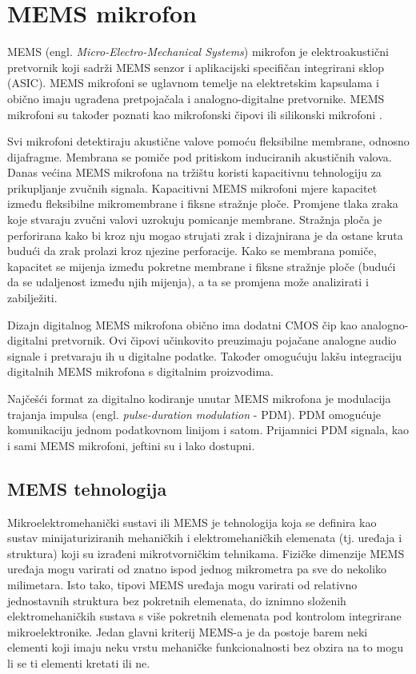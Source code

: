 \section{MEMS mikrofon}

MEMS (engl. \textit{Micro-Electro-Mechanical Systems}) mikrofon je elektroakustični pretvornik koji sadrži MEMS senzor i aplikacijski specifičan integrirani sklop (ASIC). MEMS mikrofoni se uglavnom temelje na elektretskim kapsulama i obično imaju ugrađena pretpojačala i analogno-digitalne pretvornike. MEMS mikrofoni su također poznati kao mikrofonski čipovi ili silikonski mikrofoni \cite{whatismems}. 

Svi mikrofoni detektiraju akustične valove pomoću fleksibilne membrane, odnosno dijafragme. Membrana se pomiče pod pritiskom induciranih akustičnih valova. Danas većina MEMS mikrofona na tržištu koristi kapacitivnu tehnologiju za prikupljanje zvučnih signala. Kapacitivni MEMS mikrofoni mjere kapacitet između fleksibilne mikromembrane i fiksne stražnje ploče. Promjene tlaka zraka koje stvaraju zvučni valovi uzrokuju pomicanje membrane. Stražnja ploča je perforirana kako bi kroz nju mogao strujati zrak i dizajnirana je da ostane kruta budući da zrak prolazi kroz njezine perforacije. Kako se membrana pomiče, kapacitet se mijenja između pokretne membrane i fiksne stražnje ploče (budući da se udaljenost između njih mijenja), a ta se promjena može analizirati i zabilježiti.

Dizajn digitalnog MEMS mikrofona obično ima dodatni CMOS čip kao analogno-digitalni pretvornik. Ovi čipovi učinkovito preuzimaju pojačane analogne audio signale i pretvaraju ih u digitalne podatke. Također omogućuju lakšu integraciju digitalnih MEMS mikrofona s digitalnim proizvodima.

Najčešći format za digitalno kodiranje unutar MEMS mikrofona je modulacija trajanja impulsa (engl. \textit{pulse-duration modulation} - PDM). PDM omogućuje komunikaciju jednom podatkovnom linijom i satom. Prijamnici PDM signala, kao i sami MEMS mikrofoni, jeftini su i lako dostupni.

\subsection{MEMS tehnologija}
Mikroelektromehanički sustavi ili MEMS je tehnologija koja se definira kao sustav minijaturiziranih mehaničkih i elektromehaničkih elemenata (tj. uređaja i struktura) koji su izrađeni mikrotvorničkim tehnikama. Fizičke dimenzije MEMS uređaja mogu varirati od znatno ispod jednog mikrometra pa sve do nekoliko milimetara. Isto tako, tipovi MEMS uređaja mogu varirati od relativno jednostavnih struktura bez pokretnih elemenata, do iznimno složenih elektromehaničkih sustava s više pokretnih elemenata pod kontrolom integrirane mikroelektronike. Jedan glavni kriterij MEMS-a je da postoje barem neki elementi koji imaju neku vrstu mehaničke funkcionalnosti bez obzira na to mogu li se ti elementi kretati ili ne.


